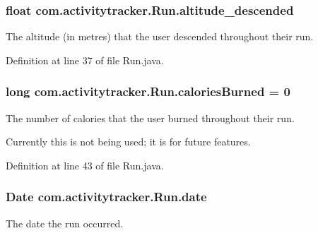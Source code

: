 \subsubsection[{\texorpdfstring{altitude\+\_\+descended}{altitude_descended}}]{\setlength{\rightskip}{0pt plus 5cm}float com.\+activitytracker.\+Run.\+altitude\+\_\+descended\hspace{0.3cm}{\ttfamily [package]}}\hypertarget{classcom_1_1activitytracker_1_1_run_a26cd078680ee374482ce848b90308dda}{}\label{classcom_1_1activitytracker_1_1_run_a26cd078680ee374482ce848b90308dda}
The altitude (in metres) that the user descended throughout their run. 

Definition at line 37 of file Run.\+java.

\subsubsection[{\texorpdfstring{calories\+Burned}{caloriesBurned}}]{\setlength{\rightskip}{0pt plus 5cm}long com.\+activitytracker.\+Run.\+calories\+Burned = 0\hspace{0.3cm}{\ttfamily [package]}}\hypertarget{classcom_1_1activitytracker_1_1_run_aa4c73467653a47d3b14ff6653bbab853}{}\label{classcom_1_1activitytracker_1_1_run_aa4c73467653a47d3b14ff6653bbab853}
The number of calories that the user burned throughout their run.

Currently this is not being used; it is for future features. 

Definition at line 43 of file Run.\+java.

\subsubsection[{\texorpdfstring{date}{date}}]{\setlength{\rightskip}{0pt plus 5cm}Date com.\+activitytracker.\+Run.\+date\hspace{0.3cm}{\ttfamily [package]}}\hypertarget{classcom_1_1activitytracker_1_1_run_a66934b1f4fe6bc74a4e98574a2892764}{}\label{classcom_1_1activitytracker_1_1_run_a66934b1f4fe6bc74a4e98574a2892764}
The date the run occurred. 

